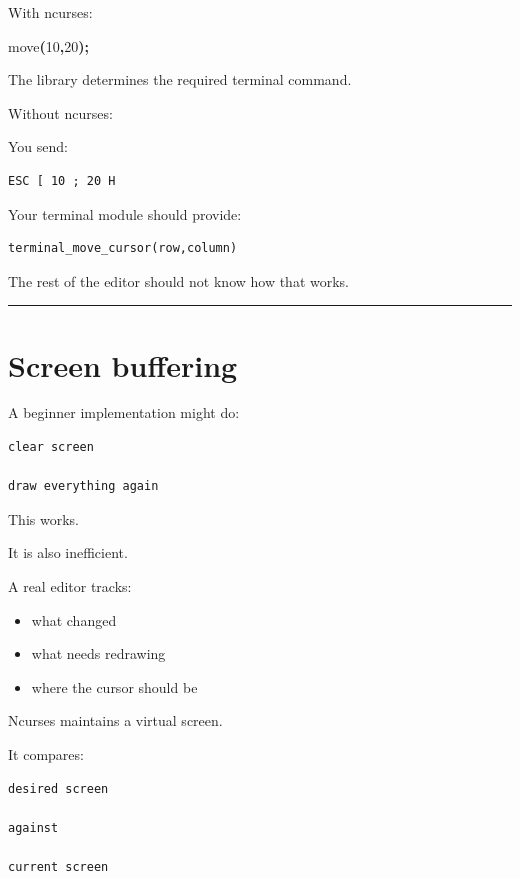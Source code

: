 \documentclass[
  oneside,
  openany]{book}
\newenvironment{Shaded}{\begin{snugshade}}{\end{snugshade}}
\newcommand{\DecValTok}[1]{\textcolor[rgb]{0.00,0.00,0.81}{#1}}
\newcommand{\NormalTok}[1]{#1}
\newcommand{\OperatorTok}[1]{\textcolor[rgb]{0.81,0.36,0.00}{\textbf{#1}}}
\providecommand{\tightlist}{%
  \setlength{\itemsep}{0pt}\setlength{\parskip}{0pt}}
\begin{document}
With ncurses:

\begin{Shaded}
\begin{Highlighting}[]
\NormalTok{move}\OperatorTok{(}\DecValTok{10}\OperatorTok{,}\DecValTok{20}\OperatorTok{);}
\end{Highlighting}
\end{Shaded}

The library determines the required terminal command.

Without ncurses:

You send:

\begin{verbatim}
ESC [ 10 ; 20 H
\end{verbatim}

Your terminal module should provide:

\begin{verbatim}
terminal_move_cursor(row,column)
\end{verbatim}

The rest of the editor should not know how that works.

\begin{center}\rule{0.5\linewidth}{0.5pt}\end{center}

\hypertarget{screen-buffering}{%
\section{Screen buffering}\label{screen-buffering}}

A beginner implementation might do:

\begin{verbatim}
clear screen

draw everything again
\end{verbatim}

This works.

It is also inefficient.

A real editor tracks:

\begin{itemize}
\tightlist
\item
  what changed
\item
  what needs redrawing
\item
  where the cursor should be
\end{itemize}

Ncurses maintains a virtual screen.

It compares:

\begin{verbatim}
desired screen

against

current screen
\end{verbatim}
\end{document}
